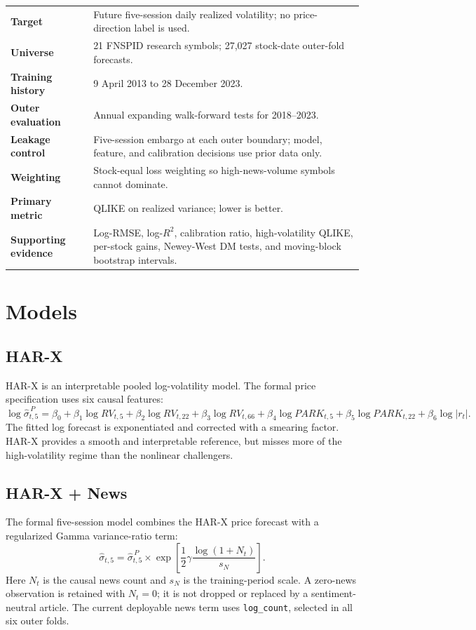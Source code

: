 \documentclass[10pt]{article}
\begin{document}
\begin{tabularx}{\textwidth}{>{\bfseries}p{}X}
\toprule
Target & Future five-session daily realized volatility; no price-direction label is used. \\
Universe & 21 FNSPID research symbols; 27,027 stock-date outer-fold forecasts. \\
Training history & 9 April 2013 to 28 December 2023. \\
Outer evaluation & Annual expanding walk-forward tests for 2018--2023. \\
Leakage control & Five-session embargo at each outer boundary; model, feature, and calibration decisions use prior data only. \\
Weighting & Stock-equal loss weighting so high-news-volume symbols cannot dominate. \\
Primary metric & QLIKE on realized variance; lower is better. \\
Supporting evidence & Log-RMSE, log-\(R^2\), calibration ratio, high-volatility QLIKE, per-stock gains, Newey-West DM tests, and moving-block bootstrap intervals. \\
\bottomrule
\end{tabularx}

\section{Models}

\subsection{HAR-X}

HAR-X is an interpretable pooled log-volatility model. The formal price
specification uses six causal features:
\[
\log \widehat{\sigma}^{\,P}_{t,5}
=
\beta_0
+\beta_1\log RV_{t,5}
+\beta_2\log RV_{t,22}
+\beta_3\log RV_{t,66}
+\beta_4\log PARK_{t,5}
+\beta_5\log PARK_{t,22}
+\beta_6\log |r_t|.
\]
The fitted log forecast is exponentiated and corrected with a smearing factor.
HAR-X provides a smooth and interpretable reference, but misses more of the
high-volatility regime than the nonlinear challengers.

\subsection{HAR-X + News}

The formal five-session model combines the HAR-X price forecast with a
regularized Gamma variance-ratio term:
\[
\widehat{\sigma}_{t,5}
=
\widehat{\sigma}^{\,P}_{t,5}
\times
\exp\!\left[
  \frac{1}{2}\gamma
  \frac{\log(1+N_t)}{s_N}
\right].
\]
Here \(N_t\) is the causal news count and \(s_N\) is the training-period scale.
A zero-news observation is retained with \(N_t=0\); it is not dropped or
replaced by a sentiment-neutral article. The current deployable news term uses
\texttt{log\_count}, selected in all six outer folds.
\end{document}

